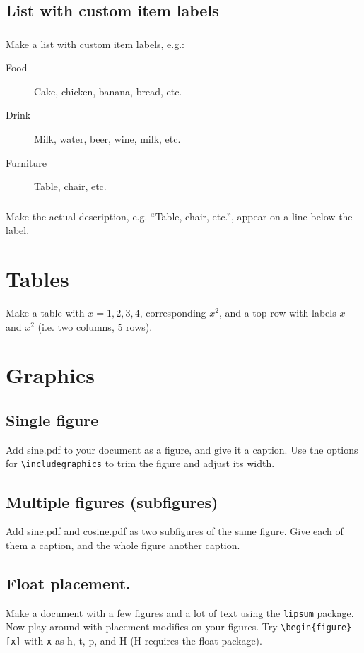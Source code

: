\documentclass[a4paper, 12pt]{article}
\begin{document}
\subsection{List with custom item labels }
\subsubsection{}
Make a list with custom item labels, e.g.:
\begin{description}
	\item[Food] Cake, chicken, banana, bread, etc.
	\item[Drink] Milk, water, beer, wine, milk, etc.
	\item[Furniture] Table, chair, etc.
\end{description}
\subsubsection{}
Make the actual description, e.g. ``Table, chair, etc.'', appear on a line below the label.

\section{Tables}
Make a table with $x = {1,2,3,4}$, corresponding $x^2$, and a top row with labels $x$ and $x^2$ (i.e. two columns, 5 rows).

\section{Graphics}
\subsection{Single figure}
Add sine.pdf to your document as a figure, and give it a caption. Use the options for \verb!\includegraphics! to trim the figure and adjust its width.

\subsection{Multiple figures (subfigures)}
Add sine.pdf and cosine.pdf as two subfigures of the same figure. Give each of them a caption, and the whole figure another caption.

\subsection{Float placement.}
Make a document with a few figures and a lot of text using the \verb!lipsum! package. Now play around with placement modifies on your figures. Try \verb!\begin{figure}[x]! with \verb!x! as h, t, p, and H (H requires the float package).
\end{document}
